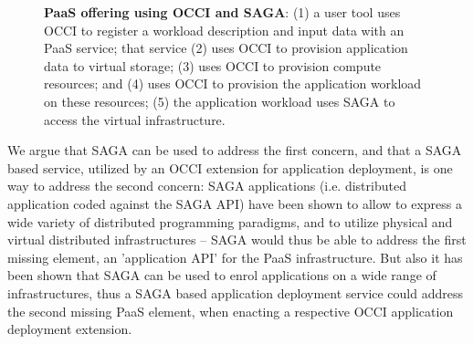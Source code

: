 \documentclass[10pt,conference,final,letterpaper,twoside,twocolumn,]{IEEEtran}
\newcommand{\B}[1]{\textbf{#1}}
\begin{document}
 \begin{figure}[htb]
  \caption{\footnotesize\label{fig:arch3} \B{PaaS offering using 
      OCCI and SAGA}: 
      (1) a user tool uses OCCI to register a workload 
          description and input data with an PaaS service; 
      that service 
      (2) uses OCCI to provision application data to virtual storage; 
      (3) uses OCCI to provision compute resources; and
      (4) uses OCCI to provision the application workload on these resources; 
      (5) the application workload uses SAGA to access the virtual
          infrastructure.}
 \end{figure}

 We argue that SAGA can be used to address the first concern, and that
 a SAGA based service, utilized by an OCCI extension for application
 deployment, is one way to address the second concern: SAGA
 applications (i.e. distributed application coded against the SAGA
 API) have been shown to allow to express a wide variety of
 distributed programming paradigms, and to utilize physical and
 virtual distributed infrastructures -- SAGA would thus be able to
 address the first missing element, an 'application API' for the PaaS
 infrastructure.  But also it has been shown that SAGA can be used to
 enrol applications on a wide range of infrastructures, thus a SAGA
 based application deployment service could address the second missing
 PaaS element, when enacting a respective OCCI application deployment
 extension.
\end{document}

